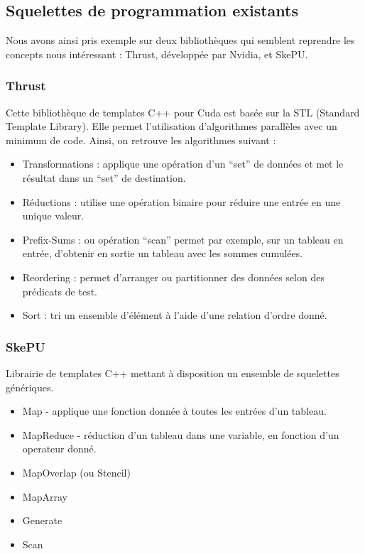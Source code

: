 \documentclass{report}
\begin{document}
\subsection{Squelettes de programmation existants}
Nous avons ainsi pris exemple sur deux bibliothèques qui semblent reprendre les concepts nous intéressant : Thrust, développée par Nvidia, et SkePU.

\subsubsection{Thrust}
Cette bibliothèque de templates C++ pour Cuda est basée sur la STL (Standard Template Library). Elle permet l’utilisation d’algorithmes parallèles avec un minimum de code. Ainsi, on retrouve les algorithmes suivant :

\begin{itemize}
\item Transformations : applique une opération d’un “set” de données et met le résultat dans un “set” de destination. 
\item Réductions : utilise une opération binaire pour réduire une entrée en une unique valeur. 
\item Prefix-Sums : ou opération “scan” permet par exemple, sur un tableau en entrée, d’obtenir en sortie un tableau avec les sommes cumulées.
\item Reordering : permet d’arranger ou partitionner des données selon des prédicats de test.
\item Sort : tri un ensemble d’élément à l’aide d’une relation d’ordre donné.
\end{itemize}

\subsubsection{SkePU}
Librairie de templates C++ mettant à disposition un ensemble de squelettes génériques.

\begin{itemize}
\item Map\cite{refMap} - applique une fonction donnée à toutes les entrées d’un tableau.
\item MapReduce - réduction d’un tableau dans une variable, en fonction d’un operateur donné.
\item MapOverlap (ou Stencil)
\item MapArray
\item Generate
\item Scan
\end{itemize}
\end{document}
